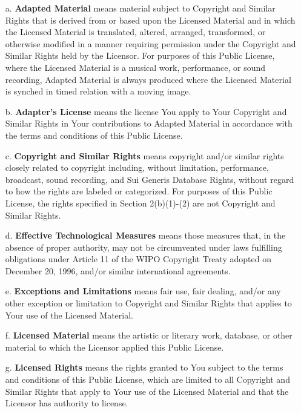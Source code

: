 \begin{enumerate}

	\item[a.]
	\textbf{Adapted Material} means material subject to Copyright and Similar
	Rights that is derived from or based upon the Licensed Material
	and in which the Licensed Material is translated, altered,
	arranged, transformed, or otherwise modified in a manner requiring
	permission under the Copyright and Similar Rights held by the
	Licensor. For purposes of this Public License, where the Licensed
	Material is a musical work, performance, or sound recording,
	Adapted Material is always produced where the Licensed Material is
	synched in timed relation with a moving image.

	\item[b.]
	\textbf{Adapter's License} means the license You apply to Your Copyright
	and Similar Rights in Your contributions to Adapted Material in
	accordance with the terms and conditions of this Public License.

	\item[c.]
	\textbf{Copyright and Similar Rights} means copyright and/or similar rights
	closely related to copyright including, without limitation,
	performance, broadcast, sound recording, and Sui Generis Database
	Rights, without regard to how the rights are labeled or
	categorized. For purposes of this Public License, the rights
	specified in Section 2(b)(1)-(2) are not Copyright and Similar
	Rights.

	\item[d.]
	\textbf{Effective Technological Measures} means those measures that, in the
	absence of proper authority, may not be circumvented under laws
	fulfilling obligations under Article 11 of the WIPO Copyright
	Treaty adopted on December 20, 1996, and/or similar international
	agreements.

	\item[e.]
	\textbf{Exceptions and Limitations} means fair use, fair dealing, and/or
	any other exception or limitation to Copyright and Similar Rights
	that applies to Your use of the Licensed Material.

	\item[f.]
	\textbf{Licensed Material} means the artistic or literary work, database,
	or other material to which the Licensor applied this Public
	License.

	\item[g.]
	\textbf{Licensed Rights} means the rights granted to You subject to the
	terms and conditions of this Public License, which are limited to
	all Copyright and Similar Rights that apply to Your use of the
	Licensed Material and that the Licensor has authority to license.


\end{enumerate}
